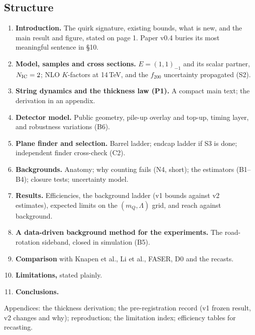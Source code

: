 \documentclass[11pt,a4paper]{article}
\begin{document}
\subsection{Structure}
\begin{enumerate}[label=\arabic*.]
  \item \textbf{Introduction.} The quirk signature, existing bounds, what is new, and the main result and figure, stated on
        page 1. Paper v0.4 buries its most meaningful sentence in \S10.
  \item \textbf{Model, samples and cross sections.} $E=(1,1)_{-1}$ and its scalar partner, $N_{\rm IC}=2$; NLO $K$-factors
        at 14\,TeV, and the $f_{200}$ uncertainty propagated (S2).
  \item \textbf{String dynamics and the thickness law (P1).} A compact main text; the derivation in an appendix.
  \item \textbf{Detector model.} Public geometry, pile-up overlay and top-up, timing layer, and robustness variations (B6).
  \item \textbf{Plane finder and selection.} Barrel ladder; endcap ladder if S3 is done; independent finder cross-check (C2).
  \item \textbf{Backgrounds.} Anatomy; why counting fails (N4, short); the estimators (B1--B4); closure tests; uncertainty
        model.
  \item \textbf{Results.} Efficiencies, the background ladder (v1 bounds against v2 estimates), expected limits on the
        $(m_Q,\Lambda)$ grid, and reach against background.
  \item \textbf{A data-driven background method for the experiments.} The road-rotation sideband, closed in simulation (B5).
  \item \textbf{Comparison} with Knapen et al., Li et al., FASER, D0 and the recasts.
  \item \textbf{Limitations,} stated plainly.
  \item \textbf{Conclusions.}
\end{enumerate}
Appendices: the thickness derivation; the pre-registration record (v1 frozen result, v2 changes and why); reproduction;
the limitation index; efficiency tables for recasting.
\end{document}

